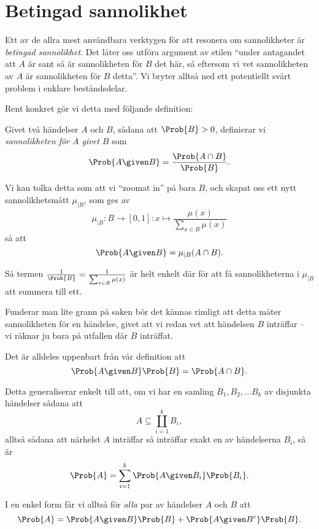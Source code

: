 \documentclass[nobib]{tufte-handout}
\begin{document}
\section{Betingad sannolikhet}

Ett av de allra mest användbara verktygen för att resonera om sannolikheter är \emph{betingad sannolikhet}. Det låter oss utföra argument av stilen ``under antagandet att $A$ är sant så är sannolikheten för $B$ det här, så eftersom vi vet sannolikheten av $A$ är sannolikheten för $B$ detta''. Vi bryter alltså ned ett potentiellt svårt problem i enklare beståndsdelar.

Rent konkret gör vi detta med följande definition:

\begin{definition}
    Givet två händelser $A$ och $B$, sådana att $\Prob{B} > 0$, definierar vi \emph{sannolikheten för $A$ givet $B$} som
    $$\Prob{A \given B} = \frac{\Prob{A \cap B}}{\Prob{B}}.$$

    Vi kan tolka detta som att vi ``zoomat in'' på bara $B$, och skapat oss ett nytt sannolikhetsmått $\mu_{|B}$, som ges av
    $$\mu_{|B}: B \to [0,1]: x \mapsto \frac{\mu(x)}{\sum_{x\in B} \mu(x)}$$
    så att
    $$\Prob{A \given B} = \mu_{|B}(A \cap B).$$
    
    Så termen $\frac{1}{\Prob{B}} = \frac{1}{\sum_{x\in B} \mu(x)}$ är helt enkelt där för att få sannolikheterna i $\mu_{|B}$ att summera till ett.

    Funderar man lite grann på saken bör det kännas rimligt att detta mäter sannolikheten för en händelse, givet att vi redan vet att händelsen $B$ inträffar -- vi räknar ju bara på utfallen där $B$ inträffat.
\end{definition}

\begin{lemma}\label{law_of_total_probability}
    Det är alldeles uppenbart från vår definition att
    $$\Prob{A \given B}\Prob{B} = \Prob{A \cap B}.$$

    Detta generaliserar enkelt till att, om vi har en samling $B_1, B_2, \ldots B_k$ av disjunkta händelser sådana att
    $$A \subseteq \coprod_{i=1}^k B_i,$$
    alltså sådana att närhelst $A$ inträffar så inträffar exakt en av händelserna $B_i$, så är
    $$\Prob{A} = \sum_{i=1}^{k} \Prob{A \given B_i}\Prob{B_i}.$$

    I en enkel form får vi alltså för \emph{alla} par av händelser $A$ och $B$ att
    $$\Prob{A} = \Prob{A \given B}\Prob{B} + \Prob{A \given B^c}\Prob{B}.$$
\end{lemma}
\end{document}
